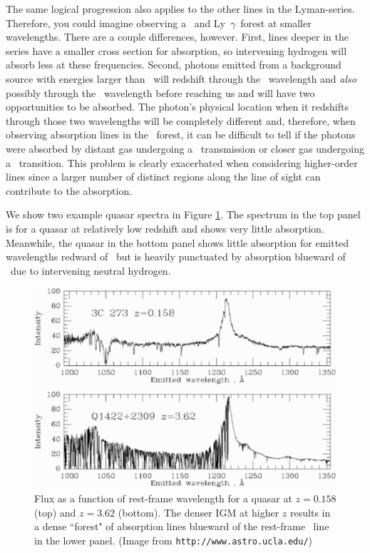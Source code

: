 The same logical progression also applies to the other lines in the Lyman-series. Therefore, you could imagine observing a \lyb\ and Ly\ $\gamma$\ forest at smaller wavelengths. There are a couple differences, however. First, lines deeper in the series have a smaller cross section for absorption, so intervening hydrogen will absorb less at these frequencies. Second, photons emitted from a background source with energies larger than \lyb\ will redshift through the \lyb\ wavelength and \textit{also} possibly through the \lya\ wavelength before reaching us and will have two opportunities to be absorbed. The photon's physical location when it redshifts through those two wavelengths will be completely different and, therefore, when observing absorption lines in the \lyb\ forest, it can be difficult to tell if the photons were absorbed by distant gas undergoing a \lyb\ transmission or closer gas undergoing a \lya\ transition. This problem is clearly exacerbated when considering higher-order lines since a larger number of distinct regions along the line of sight can contribute to the absorption.


We show two example quasar spectra in Figure \ref{fig:LyaExample}. The spectrum in the top panel is for a quasar at relatively low redshift and shows very little absorption. Meanwhile, the quasar in the bottom panel shows little absorption for emitted wavelengths redward of \lya\ but is heavily punctuated by absorption blueward of \lya\ due to intervening neutral hydrogen.
 
\begin{figure}[h]
  \centering
  \includegraphics[width=12cm]{Lya-forest-60.eps}
  \caption{Flux as a function of rest-frame wavelength for a quasar at $z = 0.158$ (top) and $z = 3.62$ (bottom). The denser IGM at higher $z$ results in a dense ``forest" of absorption lines blueward of the rest-frame \lya\ line in the lower panel. (Image from {\tt http://www.astro.ucla.edu/})}
  \label{fig:LyaExample}
\end{figure}

